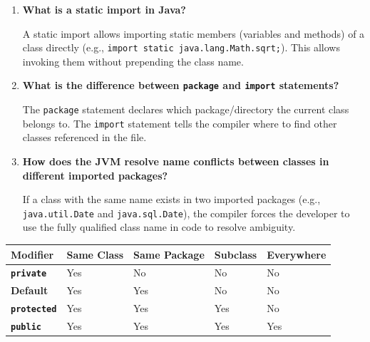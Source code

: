 \documentclass[12pt,a4paper]{article}
\newcommand{\Q}[1]{\textbf{#1}\par\noindent\ignorespaces}
\renewcommand{\arraystretch}{1.45}
\begin{document}
\begin{tcolorbox}[exambox, title={\textbf{Frequently Asked / Viva Questions}}]
\begin{enumerate}[leftmargin=*, label=\textbf{Q\arabic*.}, itemsep=5pt]
  \item \Q{What is a static import in Java?}
        A static import allows importing static members (variables and methods) of a class directly (e.g., \texttt{import static java.lang.Math.sqrt;}). This allows invoking them without prepending the class name.
        
  \item \Q{What is the difference between \texttt{package} and \texttt{import} statements?}
        The \texttt{package} statement declares which package/directory the current class belongs to. The \texttt{import} statement tells the compiler where to find other classes referenced in the file.
        
  \item \Q{How does the JVM resolve name conflicts between classes in different imported packages?}
        If a class with the same name exists in two imported packages (e.g., \texttt{java.util.Date} and \texttt{java.sql.Date}), the compiler forces the developer to use the fully qualified class name in code to resolve ambiguity.
\end{enumerate}
\end{tcolorbox}

\begin{tcolorbox}[tikzbox, title={Java Access Modifier Visibility Matrix}]
\centering
{\renewcommand{\arraystretch}{1.45}%
\begin{tabularx}{\linewidth}{|B{2.8cm}|>{\centering\arraybackslash}X|>{\centering\arraybackslash}X|>{\centering\arraybackslash}X|>{\centering\arraybackslash}X|}
\hline
\textbf{Modifier} & \textbf{Same Class} & \textbf{Same Package} & \textbf{Subclass} & \textbf{Everywhere} \\
\hline
\textbf{\texttt{private}} & Yes & No & No & No \\
\hline
\textbf{Default} & Yes & Yes & No & No \\
\hline
\textbf{\texttt{protected}} & Yes & Yes & Yes & No \\
\hline
\textbf{\texttt{public}} & Yes & Yes & Yes & Yes \\
\hline
\end{tabularx}}
\end{tcolorbox}
\end{document}
